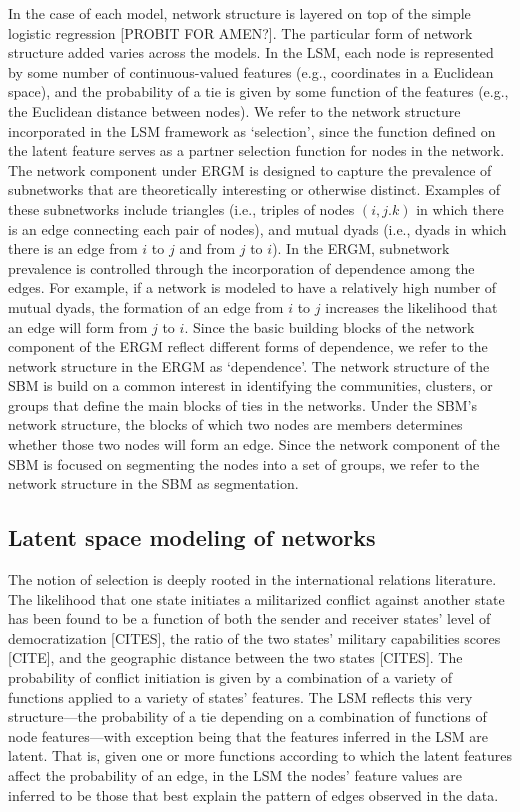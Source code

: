 \documentclass[fleqn,12pt]{wlscirep}
\begin{document}
In the case of each model, network structure is layered on top of the simple logistic regression [PROBIT FOR AMEN?]. The particular form of network structure added varies across the models. In the LSM, each node is represented by some number of continuous-valued features (e.g., coordinates in a Euclidean space), and the probability of a tie is given by some function of the features (e.g., the Euclidean distance between nodes). We refer to the network structure incorporated in the LSM framework as `selection', since the function defined on the latent feature serves as a partner selection function for nodes in the network. The network component under ERGM is designed to capture the prevalence of subnetworks that are theoretically interesting or otherwise distinct. Examples of these subnetworks include triangles (i.e., triples of nodes $(i,j.k)$ in which there is an edge connecting each pair of nodes), and mutual dyads (i.e., dyads in which there is an edge from $i$ to $j$ and from $j$ to $i$). In the ERGM, subnetwork prevalence is controlled through the incorporation of dependence among the edges. For example, if a network is modeled to have a relatively high number of mutual dyads, the formation of an edge from $i$ to $j$ increases the likelihood that an edge will form from $j$ to $i$. Since the basic building blocks of the network component of the ERGM reflect different forms of dependence, we refer to the network structure in the ERGM as `dependence'. The network structure of the SBM is build on a common interest in identifying the communities, clusters, or groups that define the main blocks of ties in the networks. Under the SBM's network structure, the blocks of which two nodes are members determines whether those two nodes will form an edge. Since the network component of the SBM is focused on segmenting the nodes into a set of groups, we refer to the network structure in the SBM as segmentation.

\subsection{Latent space modeling of networks}
The notion of selection is deeply rooted in the international relations literature. The likelihood that one state initiates a militarized conflict against another state has been found to be a function of both the sender and receiver states' level of democratization [CITES], the ratio of the two states' military capabilities scores [CITE], and the geographic distance between the two states [CITES]. The probability of conflict initiation is given by a combination of a variety of functions applied to a variety of states' features. The LSM reflects this very structure---the probability of a tie depending on a combination of functions of node features---with exception being that the features inferred in the LSM are latent. That is, given one or more functions according to which the latent features affect the probability of an edge,  in the LSM the nodes' feature values are inferred to be those that best explain the pattern of edges observed in the data.
\end{document}
